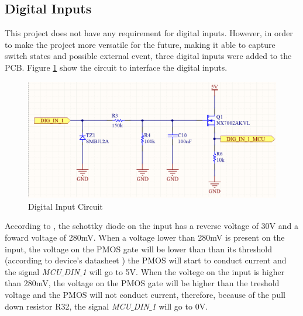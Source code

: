 	\subsection{Digital Inputs}\label{ssec:digital-inputs}

		This project does not have any requirement for digital inputs. However, in order to make the project more versatile for the future, making it able to capture switch states and possible external event, three digital inputs were added to the PCB. Figure \ref{fig:digital-input-circuit} show the circuit to interface the digital inputs.

			\begin{figure}[htbp]
				\centering
				\includegraphics[scale=1]{figuras/fig-digital-input-circuit}
				\caption{Digital Input Circuit}
				\label{fig:digital-input-circuit}
			\end{figure}

		According to \cite{RB751V40T1-datasheet}, the schottky diode on the input has a reverse voltage of 30V and a foward voltage of 280mV. When a voltage lower than 280mV is present on the input, the voltage on the PMOS gate will be lower than than its threshold (according to device's datasheet \cite{RU1C002ZP-datasheet}) the PMOS will start to conduct current and the signal \textit{MCU$\_$DIN$\_$1} will go to 5V. When the voltege on the input is higher than 280mV, the voltage on the PMOS gate will be higher than the treshold voltage and the PMOS will not conduct current, therefore, because of the pull down resistor R32, the signal \textit{MCU$\_$DIN$\_$1} will go to 0V.